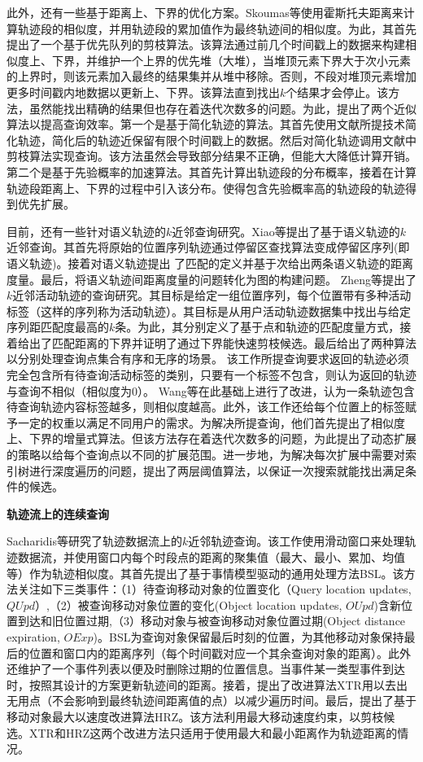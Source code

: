 此外，还有一些基于距离上、下界的优化方案。Skoumas等使用霍斯托夫距离来计算轨迹段的相似度，并用轨迹段的累加值作为最终轨迹间的相似度\cite{Skoumas}。为此，其首先提出了一个基于优先队列的剪枝算法。该算法通过前几个时间戳上的数据来构建相似度上、下界，并维护一个上界的优先堆（大堆），当堆顶元素下界大于次小元素的上界时，则该元素加入最终的结果集并从堆中移除。否则，不段对堆顶元素增加更多时间戳内地数据以更新上、下界。该算法直到找出$k$个结果才会停止。该方法，虽然能找出精确的结果但也存在着迭代次数多的问题。为此，提出了两个近似算法以提高查询效率。第一个是基于简化轨迹的算法。其首先使用文献\cite{Zhao1997LINEAR}所提技术简化轨迹，简化后的轨迹近保留有限个时间戳上的数据。然后对简化轨迹调用文献\cite{Skoumas}中剪枝算法实现查询。该方法虽然会导致部分结果不正确，但能大大降低计算开销。第二个是基于先验概率的加速算法。其首先计算出轨迹段的分布概率，接着在计算轨迹段距离上、下界的过程中引入该分布。使得包含先验概率高的轨迹段的轨迹得到优先扩展。


目前，还有一些针对语义轨迹的$k$近邻查询研究\cite{Xiao,Kaiser,WangBCSSQ17}。Xiao等提出了基于语义轨迹的$k$近邻查询\cite{Xiao}。其首先将原始的位置序列轨迹通过停留区查找算法变成停留区序列(即语义轨迹)。接着对语义轨迹提出 了匹配的定义并基于次给出两条语义轨迹的距离度量。最后，将语义轨迹间距离度量的问题转化为图的构建问题。
Zheng等提出了$k$近邻活动轨迹的查询研究。其目标是给定一组位置序列，每个位置带有多种活动标签（这样的序列称为活动轨迹）\cite{Kaiser}。其目标是从用户活动轨迹数据集中找出与给定序列距匹配度最高的$k$条。为此，其分别定义了基于点和轨迹的匹配度量方式，接着给出了匹配距离的下界并证明了通过下界能快速剪枝候选。最后给出了两种算法以分别处理查询点集合有序和无序的场景。
该工作所提查询要求返回的轨迹必须完全包含所有待查询活动标签的类别，只要有一个标签不包含，则认为返回的轨迹与查询不相似（相似度为0）。
Wang等在此基础上进行了改进，认为一条轨迹包含待查询轨迹内容标签越多，则相似度越高\cite{WangBCSSQ17}。此外，该工作还给每个位置上的标签赋予一定的权重以满足不同用户的需求。为解决所提查询，他们首先提出了相似度上、下界的增量式算法。但该方法存在着迭代次数多的问题，为此提出了动态扩展的策略以给每个查询点以不同的扩展范围。进一步地，为解决每次扩展中需要对索引树进行深度遍历的问题，提出了两层阈值算法，以保证一次搜索就能找出满足条件的候选。

\textbf{轨迹流上的连续查询}

Sacharidis等研究了轨迹数据流上的$k$近邻轨迹查询\cite{SacharidisSS14}。该工作使用滑动窗口来处理轨迹数据流，并使用窗口内每个时段点的距离的聚集值（最大、最小、累加、均值等）作为轨迹相似度。其首先提出了基于事情模型驱动的通用处理方法BSL。该方法关注如下三类事件：（1）待查询移动对象的位置变化（Query location updates,$QUpd$）,（2）被查询移动对象位置的变化(Object location updates, $OUpd$)含新位置到达和旧位置过期,（3）移动对象与被查询移动对象位置过期(Object distance expiration, $OExp$)。BSL为查询对象保留最后时刻的位置，为其他移动对象保持最后的位置和窗口内的距离序列（每个时间戳对应一个其余查询对象的距离）。此外还维护了一个事件列表以便及时删除过期的位置信息。当事件某一类型事件到达时，按照其设计的方案更新轨迹间的距离。接着，提出了改进算法XTR用以去出无用点（不会影响到最终轨迹间距离值的点）以减少遍历时间。最后，提出了基于移动对象最大以速度改进算法HRZ。该方法利用最大移动速度约束，以剪枝候选。XTR和HRZ这两个改进方法只适用于使用最大和最小距离作为轨迹距离的情况。

